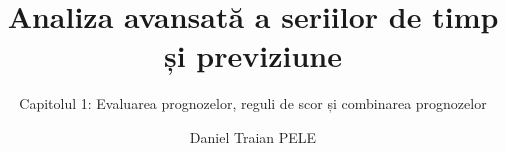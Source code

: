 \title[Analiza avansată a seriilor de timp și previziune]{Analiza avansată a seriilor de timp și previziune}
\subtitle{Capitolul 1: Evaluarea prognozelor, reguli de scor și combinarea prognozelor}
\author[D.T. Pele]{Daniel Traian PELE}
\date{}

\providecommand{\atsapplink}[3]{\hypertarget{#2}{}\hyperlink{#1}{\beamergotobutton{#3}}}  %
\providecommand{\atsappback}[2]{\begin{tikzpicture}[remember picture,overlay]\node[anchor=south east] at ([xshift=-3mm,yshift=7mm]current page.south east){\hyperlink{#1}{\beamerreturnbutton{#2}}};\end{tikzpicture}}  %
\providecommand{\atschlink}[2]{\href{#1}{#2}}  %
\providecommand{\atschlinkt}[2]{\href{#1}{\usebeamercolor[fg]{frametitle}#2}}  %


